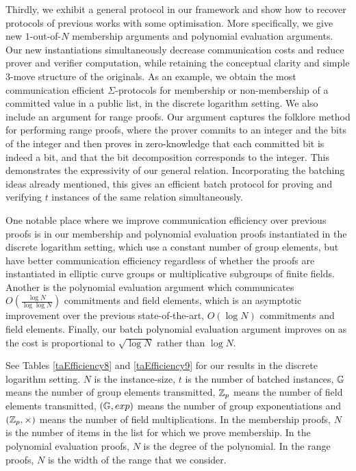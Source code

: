 Thirdly, we exhibit a general protocol in our framework and show how to recover protocols of previous works with some optimisation. More specifically, we give new $1$-out-of-$N$ membership arguments and  polynomial evaluation arguments. Our new instantiations simultaneously decrease communication costs and reduce prover and verifier computation, while retaining the conceptual clarity and simple 3-move structure of the originals. As an example, we obtain the most communication efficient $\Sigma$-protocols for membership or non-membership of a committed value in a public list, in the discrete logarithm setting. We also include an argument for range proofs. Our argument captures the folklore method for performing range proofs, where the prover commits to an integer and the bits of the integer and then proves in zero-knowledge that each committed bit is indeed a bit, and that the bit decomposition corresponds to the integer. This demonstrates the expressivity of our general relation. Incorporating the batching ideas already mentioned, this gives an efficient batch protocol for proving and verifying $t$ instances of the same relation simultaneously.

One notable place where we improve communication efficiency over previous proofs is in our membership and polynomial evaluation proofs instantiated in the discrete logarithm setting, which use a constant number of group elements, but have better communication efficiency regardless of whether the proofs are instantiated in elliptic curve groups or multiplicative subgroups of finite fields. Another is the polynomial evaluation argument which communicates $O(\frac{\log N}{\log \log N})$ commitments and field elements, which is an asymptotic improvement over the previous state-of-the-art, $O(\log N)$ commitments and field elements. Finally, our batch polynomial evaluation argument improves on \cite{Bayer2014} as the cost is proportional to $\sqrt{\log N}$ rather than $\log N$.

See Tables \ref{taEfficiency8} and \ref{taEfficiency9} for our results in the discrete logarithm setting. $N$ is the instance-size, $t$ is the number of batched instances, $\mathbb{G}$ means the number of group elements transmitted, $\mathbb{Z}_p$ means the number of field elements transmitted, $(\mathbb{G},exp)$ means the number of group exponentiations and $(\mathbb{Z}_p,\times)$ means the number of field multiplications. In the membership proofs, $N$ is the number of items in the list for which we prove membership. In the polynomial evaluation proofs, $N$ is the degree of the polynomial. In the range proofs, $N$ is the width of the range that we consider.

